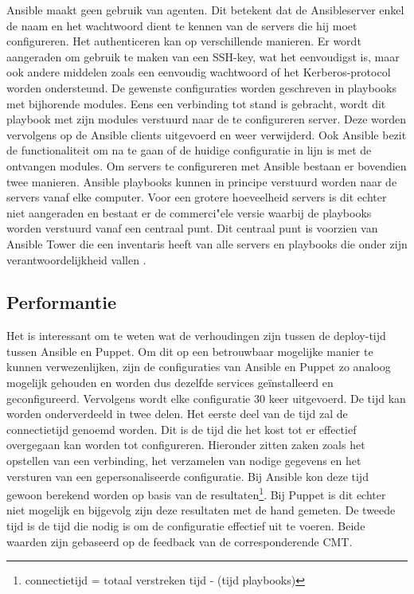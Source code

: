 Ansible maakt geen gebruik van agenten. Dit betekent dat de Ansibleserver enkel de naam en het wachtwoord dient te kennen van de servers die hij moet configureren. Het authenticeren kan op verschillende manieren. Er wordt aangeraden om gebruik te maken van een SSH-key, wat het eenvoudigst is, maar ook andere middelen zoals een eenvoudig wachtwoord of het Kerberos-protocol worden ondersteund. De gewenste configuraties worden geschreven in playbooks met bijhorende modules. Eens een verbinding tot stand is gebracht, wordt dit playbook met zijn modules verstuurd naar de te configureren server. Deze worden vervolgens op de Ansible clients uitgevoerd  en weer verwijderd. Ook Ansible bezit de functionaliteit om na te gaan of de huidige configuratie in lijn is met de ontvangen modules. Om servers te configureren met Ansible bestaan er bovendien twee manieren. Ansible playbooks kunnen in principe verstuurd worden naar de servers vanaf elke computer. Voor een grotere hoeveelheid servers is dit echter niet aangeraden en bestaat er de commerci"ele versie waarbij de playbooks worden verstuurd vanaf een centraal punt. Dit centraal punt is voorzien van Ansible Tower die een inventaris heeft van alle servers en playbooks die onder zijn verantwoordelijkheid vallen \autocite{ansibledoc}.


\subsection{Performantie}

Het is interessant om te weten wat de verhoudingen zijn tussen de deploy-tijd tussen Ansible en Puppet. Om dit op een betrouwbaar mogelijke manier te kunnen verwezenlijken, zijn de configuraties van Ansible en Puppet zo analoog mogelijk gehouden en worden dus dezelfde services ge\"installeerd en geconfigureerd. Vervolgens wordt elke configuratie 30 keer uitgevoerd. De tijd kan worden onderverdeeld in twee delen.\newline
Het eerste deel van de tijd zal de \gls{connectietijd} genoemd worden. Dit is de tijd die het kost tot er effectief overgegaan kan worden tot configureren. Hieronder zitten zaken zoals het opstellen van een verbinding, het verzamelen van nodige gegevens en het versturen van een gepersonaliseerde configuratie. Bij Ansible kon deze tijd gewoon berekend worden op basis van de resultaten\footnote{connectietijd = totaal verstreken tijd -  \unexpanded{$ \sum  $} (tijd playbooks)}. Bij Puppet is dit echter niet mogelijk en bijgevolg zijn deze resultaten met de hand gemeten.\newline
 De tweede tijd is de tijd die nodig is om de configuratie effectief uit te voeren. Beide waarden zijn gebaseerd op de feedback van de corresponderende \gls{CMT}.

